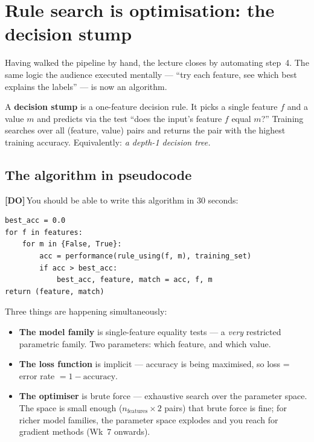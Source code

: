 \documentclass[11pt, a4paper]{article}
\newcommand{\doflag}{\textcolor{defBd}{\textbf{[DO]}}\,}
\begin{document}
\section{Rule search is optimisation: the decision stump}

Having walked the pipeline by hand, the lecture closes by automating step~4. The same logic the audience executed mentally — ``try each feature, see which best explains the labels'' — is now an algorithm.

\begin{defbox}
A \textbf{decision stump} is a one-feature decision rule. It picks a single feature $f$ and a value $m$ and predicts via the test ``does the input's feature $f$ equal $m$?'' Training searches over all (feature, value) pairs and returns the pair with the highest training accuracy. Equivalently: \emph{a depth-1 decision tree.}
\end{defbox}

\subsection{The algorithm in pseudocode}

\doflag{}You should be able to write this algorithm in 30 seconds:

\begin{verbatim}
best_acc = 0.0
for f in features:
    for m in {False, True}:
        acc = performance(rule_using(f, m), training_set)
        if acc > best_acc:
            best_acc, feature, match = acc, f, m
return (feature, match)
\end{verbatim}

Three things are happening simultaneously:

\begin{itemize}
  \item \textbf{The model family} is single-feature equality tests — a \emph{very} restricted parametric family. Two parameters: which feature, and which value.
  \item \textbf{The loss function} is implicit — accuracy is being maximised, so loss = error rate $= 1 - \text{accuracy}$.
  \item \textbf{The optimiser} is brute force — exhaustive search over the parameter space. The space is small enough ($n_{\text{features}} \times 2$ pairs) that brute force is fine; for richer model families, the parameter space explodes and you reach for gradient methods (Wk~7 onwards).
\end{itemize}
\end{document}
